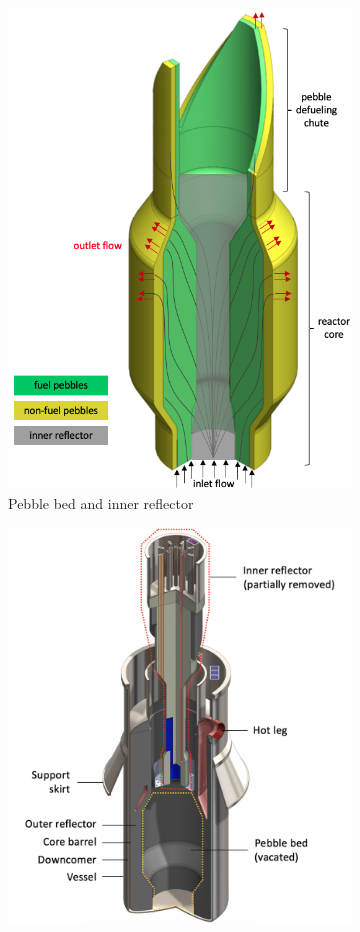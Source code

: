 \begin{figure}[h!]
    \begin{subfigure}{0.5\linewidth}
        \centering
        \includegraphics[height=1.1\linewidth]{figs/pbfhr_core.png}
       \caption{Pebble bed and inner reflector}
       \label{fig:pbfhr_core}
    \end{subfigure}
    \begin{subfigure}{0.5\linewidth}
        \centering
        \includegraphics[height=1.1\linewidth]{figs/pbfhr_cad_core.png}

\end{subfigure}
\end{figure}
